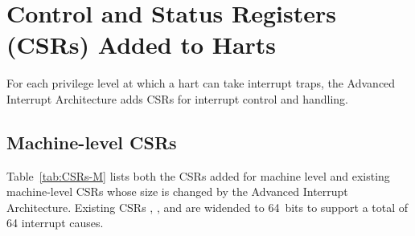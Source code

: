 
\chapter{Control and Status Registers (CSRs) Added to Harts}
\label{ch:CSRs}

For each privilege level at which a {\RISCV} hart can take interrupt
traps, the Advanced Interrupt Architecture adds CSRs for interrupt
control and handling.

\section{Machine-level CSRs}

Table~\ref{tab:CSRs-M} lists both the CSRs added for machine level
and existing machine-level CSRs whose size is changed
by the Advanced Interrupt Architecture.
Existing CSRs , , and  are
widended to 64~bits to support a total of 64 interrupt causes.

